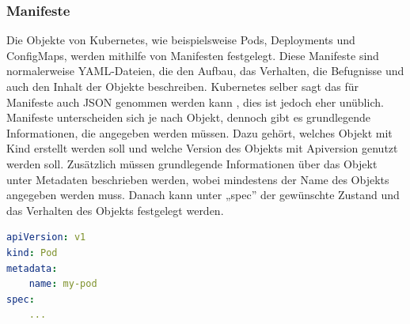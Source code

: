 \subsubsection{Manifeste}

Die Objekte von Kubernetes, wie beispielsweise Pods, Deployments und ConfigMaps, werden mithilfe von Manifesten festgelegt. 
Diese Manifeste sind normalerweise YAML-Dateien, die den Aufbau, das Verhalten, die Befugnisse und auch den Inhalt der Objekte beschreiben. 
Kubernetes selber sagt das für Manifeste auch JSON genommen werden kann \parencite{kubernetesObjects}, dies ist jedoch eher unüblich.
Manifeste unterscheiden sich je nach Objekt, dennoch gibt es grundlegende Informationen, die angegeben werden müssen.
Dazu gehört, welches Objekt mit Kind erstellt werden soll und welche Version des Objekts mit Apiversion genutzt werden soll. 
Zusätzlich müssen grundlegende Informationen über das Objekt unter Metadaten beschrieben werden, wobei mindestens der Name des Objekts angegeben werden muss. 
Danach kann unter „spec” der gewünschte Zustand und das Verhalten des Objekts festgelegt werden.

\begin{lstlisting}[language=yaml, caption={Beispiel von einen Manifest}]
apiVersion: v1
kind: Pod
metadata:
    name: my-pod
spec:
    ...
\end{lstlisting}